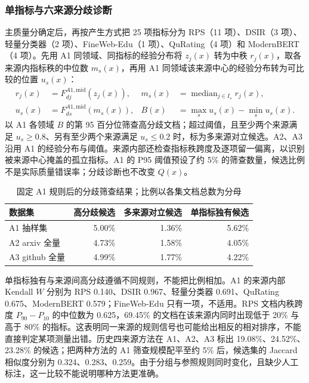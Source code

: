 \subsubsection{单指标与六来源分歧诊断}
主质量分确定后，再按产生方式把 25 项指标分为 RPS（11 项）、DSIR（3 项）、轻量分类器（2 项）、FineWeb-Edu（1 项）、QuRating（4 项）和 ModernBERT（4 项）。先用 A1 同领域、同指标的经验分布将 $z_j(x)$ 转为中秩 $r_j(x)$，取各来源内指标秩的中位数 $m_s(x)$，再用 A1 同领域该来源中心的经验分布转为可比较的位置 $u_s(x)$：
\begin{equation}
\begin{aligned}
r_j(x)&=F_{dj}^{A1,\mathrm{mid}}(z_j(x)), &
m_s(x)&=\operatorname{median}_{j\in I_s}r_j(x),\\
u_s(x)&=F_{ds}^{A1,\mathrm{mid}}(m_s(x)), &
B(x)&=\max_s u_s(x)-\min_s u_s(x).
\end{aligned}
\label{eq:q1_conflict}
\end{equation}
以 A1 各领域 $B$ 的第 95 百分位筛查高分歧文档；超过阈值，且至少两个来源满足 $u_s\geq0.8$、另有至少两个来源满足 $u_s\leq0.2$ 时，标为多来源对立候选。A2、A3 沿用 A1 的经验分布与阈值。来源内部还检查指标秩跨度及逐项留一偏离，以识别被来源中心掩盖的孤立指标。A1 的 P95 阈值预设了约 5\% 的筛查数量，候选比例不是实际质量错误率；分歧诊断也不改变 $Q(x)$。

\begin{table}[htbp]
\centering\small
\caption{固定 A1 规则后的分歧筛查结果；比例以各集文档总数为分母}
\label{tab:q1_candidates}
\begin{tabular}{lrrr}
\toprule 数据集 & 高分歧候选 & 多来源对立候选 & 单指标独有候选 \\
\midrule
A1 抽样集 & 5.00\% & 1.36\% & 5.62\% \\
A2 arxiv 全量 & 4.73\% & 1.58\% & 4.05\% \\
A3 github 全量 & 4.99\% & 1.77\% & 4.22\% \\
\bottomrule
\end{tabular}
\end{table}
单指标独有与来源间高分歧遵循不同规则，不能把比例相加。A1 的来源内部 Kendall $W$ 分别为 RPS 0.140、DSIR 0.967、轻量分类器 0.691、QuRating 0.675、ModernBERT 0.579；FineWeb-Edu 只有一项，不适用。RPS 文档内秩跨度 $P_{90}-P_{10}$ 的中位数为 0.625，69.45\% 的文档在该来源内同时出现低于 20\% 与高于 80\% 的指标。这表明同一来源的规则信号也可能给出相反的相对排序，不能直接判定某项测量出错。历史四来源方法在 A1、A2、A3 标出 19.08\%、24.52\%、23.28\% 的候选；把两种方法的 A1 筛查规模配平至约 5\% 后，候选集的 Jaccard 相似度分别为 0.324、0.283、0.259。由于分组与参照规则同时变化，且缺少人工标注，这一比较不能说明哪种方法更准确。


